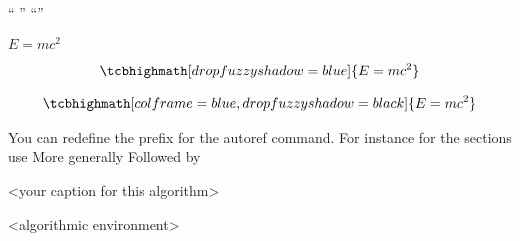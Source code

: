 
“ ”       
“”




\begin{mdframed}[style=MyFrame]
    $E = m c^2$
\end{mdframed}

\begin{equation*}
\tcbhighmath[drop fuzzy shadow=blue]
{
    \begin{aligned}
        E = m c^2
    \end{aligned}
}
\end{equation*} 

\begin{equation*}
\tcbhighmath[colframe=blue,drop fuzzy shadow=black]
{
    \begin{aligned}
        E = m c^2
    \end{aligned}
}
\end{equation*}

You can redefine the prefix for the autoref command. For instance for the sections use
\def\sectionautorefname{New prefix for the sections}
More generally
\def\<type>autorefname{<new name>}
Followed by
\addto\extrasenglish{%
  \renewcommand{\sectionautorefname}{Section}%
}





\begin{algorithm}[H]
\caption{<your caption for this algorithm>}
\label{<your label for references later in your document>}
\begin{algorithmic}[1]  %
<algorithmic environment>
\end{algorithmic}
\end{algorithm}